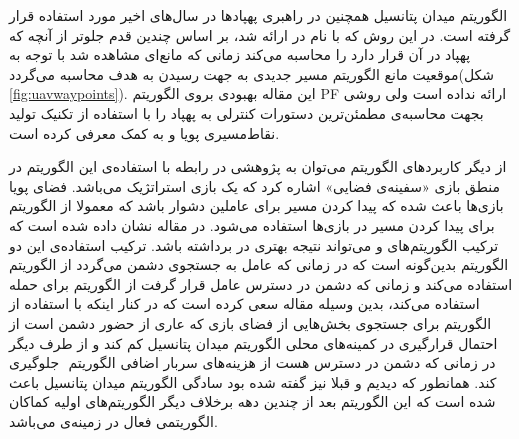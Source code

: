 الگوریتم میدان پتانسیل همچنین در راهبری پهپادها در سال‌های اخیر مورد استفاده قرار گرفته است. در این روش که با نام  در  ارائه شد، بر اساس  چندین قدم جلوتر از آنچه که پهپاد در آن قرار دارد را محاسبه می‌کند زمانی که مانع‌ای مشاهده شد با توجه به موقعیت مانع الگوریتم  مسیر جدیدی به جهت رسیدن به هدف محاسبه می‌گردد(شکل \ref{fig:uavwaypoints}). این مقاله بهبودی بروی الگوریتم PF ارائه نداده است ولی روشی بجهت محاسبه‌ی مطمئن‌ترین دستورات کنترلی به پهپاد را با استفاده از تکنیک تولید نقاط‌مسیری پویا و به کمک  معرفی کرده است.


از دیگر کاربردهای الگوریتم  می‌توان به پژوهشی در رابطه با استفاده‌ی این الگوریتم در منطق بازی «سفینه‌ی فضایی» اشاره کرد که یک بازی استراتژیک می‌باشد. فضای پویا بازی‌ها باعث شده که پیدا کردن مسیر برای عاملین دشوار باشد که معمولا از الگوریتم  برای پیدا کردن مسیر در بازی‌ها استفاده می‌شود. در مقاله نشان داده شده است که ترکیب الگوریتم‌های  و  می‌تواند نتیجه بهتری در برداشته باشد. ترکیب استفاده‌ی این دو الگوریتم بدین‌گونه است که در زمانی که عامل به جستجوی دشمن می‌گردد از الگوریتم  استفاده می‌کند و زمانی که دشمن در دسترس عامل قرار گرفت از الگوریتم  برای حمله استفاده می‌کند، بدین وسیله مقاله سعی کرده است که در کنار اینکه با استفاده از الگوریتم  برای جستجوی بخش‌هایی از فضای بازی که عاری از حضور دشمن است از احتمال قرارگیری در کمینه‌های محلی الگوریتم میدان پتانسیل کم کند و از طرف دیگر در زمانی که دشمن در دسترس هست از هزینه‌های سربار اضافی الگوریتم ‌‌ جلوگیری کند. همانطور که دیدیم و قبلا نیز گفته شده بود سادگی الگوریتم میدان پتانسیل باعث شده است که این الگوریتم بعد از چندین دهه برخلاف دیگر الگوریتم‌های اولیه کماکان الگوریتمی فعال در زمینه‌ی  می‌باشد.